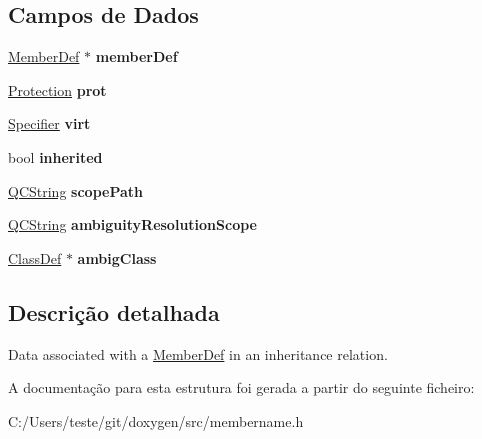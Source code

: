 \subsection*{Campos de Dados}
\begin{DoxyCompactItemize}
\item 
\hypertarget{struct_member_info_a07ff13b1e1745350150981d8adfab254}{\hyperlink{class_member_def}{Member\-Def} $\ast$ {\bfseries member\-Def}}\label{struct_member_info_a07ff13b1e1745350150981d8adfab254}

\item 
\hypertarget{struct_member_info_a3f887065f93ce5f02dea21da35468e8e}{\hyperlink{types_8h_a90e352184df58cd09455fe9996cd4ded}{Protection} {\bfseries prot}}\label{struct_member_info_a3f887065f93ce5f02dea21da35468e8e}

\item 
\hypertarget{struct_member_info_aa05b4729c780621416429c6aac10fccf}{\hyperlink{types_8h_ab16236bdd10ddf4d73a9847350f0017e}{Specifier} {\bfseries virt}}\label{struct_member_info_aa05b4729c780621416429c6aac10fccf}

\item 
\hypertarget{struct_member_info_a95daa5fde13e5a911b6caf2f2aa928d2}{bool {\bfseries inherited}}\label{struct_member_info_a95daa5fde13e5a911b6caf2f2aa928d2}

\item 
\hypertarget{struct_member_info_a287dcac5c87736cb02ef13b50338ef0e}{\hyperlink{class_q_c_string}{Q\-C\-String} {\bfseries scope\-Path}}\label{struct_member_info_a287dcac5c87736cb02ef13b50338ef0e}

\item 
\hypertarget{struct_member_info_a085db8491a3b65ce01dfc9f9c9b722d8}{\hyperlink{class_q_c_string}{Q\-C\-String} {\bfseries ambiguity\-Resolution\-Scope}}\label{struct_member_info_a085db8491a3b65ce01dfc9f9c9b722d8}

\item 
\hypertarget{struct_member_info_a5751a8acfbf92bf0903428f5151c08df}{\hyperlink{class_class_def}{Class\-Def} $\ast$ {\bfseries ambig\-Class}}\label{struct_member_info_a5751a8acfbf92bf0903428f5151c08df}

\end{DoxyCompactItemize}


\subsection{Descrição detalhada}
Data associated with a \hyperlink{class_member_def}{Member\-Def} in an inheritance relation. 

A documentação para esta estrutura foi gerada a partir do seguinte ficheiro\-:\begin{DoxyCompactItemize}
\item 
C\-:/\-Users/teste/git/doxygen/src/membername.\-h\end{DoxyCompactItemize}
